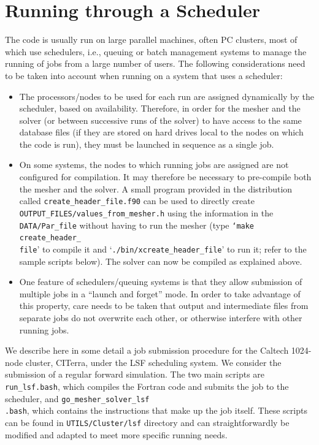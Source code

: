 \chapter{Running through a Scheduler}\label{cha:Running-Scheduler}

The code is usually run on large parallel machines, often PC clusters,
most of which use schedulers, i.e., queuing or batch management systems
to manage the running of jobs from a large number of users. The following
considerations need to be taken into account when running on a system
that uses a scheduler:

\begin{itemize}
\item The processors/nodes to be used for each run are assigned dynamically
by the scheduler, based on availability. Therefore, in order for the
mesher and the solver (or between successive runs of the solver) to
have access to the same database files (if they are stored on hard
drives local to the nodes on which the code is run), they must be
launched in sequence as a single job.
\item On some systems, the nodes to which running jobs are assigned are
not configured for compilation. It may therefore be necessary to pre-compile
both the mesher and the solver. A small program provided in the distribution
called \texttt{\small create\_header\_file.f90} can be used to directly
create\texttt{\small{} OUTPUT\_FILES/values\_from\_mesher.h} using
the information in the \texttt{\small DATA/Par\_file} without having
to run the mesher (type \texttt{\small `make}{\small{} }\texttt{\small create\_header\_}~\\
\texttt{\small file}' to compile it and `\texttt{\small ./bin/xcreate\_header\_file}'
to run it; refer to the sample scripts below). The solver can now
be compiled as explained above.
\item One feature of schedulers/queuing systems is that they allow submission
of multiple jobs in a {}``launch and forget'' mode. In order to
take advantage of this property, care needs to be taken that output
and intermediate files from separate jobs do not overwrite each other,
or otherwise interfere with other running jobs.
\end{itemize}
We describe here in some detail a job submission procedure for the
Caltech 1024-node cluster, CITerra, under the LSF scheduling system.
We consider the submission of a regular forward simulation. The two
main scripts are \texttt{\small run\_lsf.bash}, which compiles the
Fortran code and submits the job to the scheduler, and \texttt{\small go\_mesher\_solver\_lsf}~\\
\texttt{\small .bash}, which contains the instructions that make up
the job itself. These scripts can be found in \texttt{\small UTILS/Cluster/lsf}
directory and can straightforwardly be modified and adapted to meet
more specific running needs.



